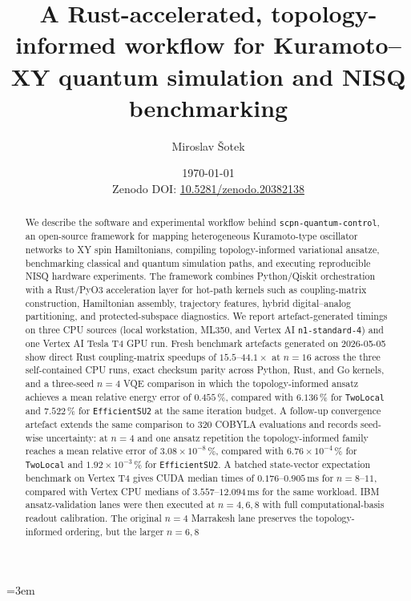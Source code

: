 \documentclass[preprint,aps,physrev,superscriptaddress,floatfix,longbibliography]{revtex4-2}
\newcommand{\paperdoi}{Zenodo DOI: \href{https://doi.org/10.5281/zenodo.20382138}{10.5281/zenodo.20382138}}
\begin{document}
\emergencystretch=3em

\title{A Rust-accelerated, topology-informed workflow for Kuramoto--XY
quantum simulation and NISQ benchmarking}

\author{Miroslav \v{S}otek}

\date{\today\\\paperdoi}

\begin{abstract}
We describe the software and experimental workflow behind
\texttt{scpn-quantum-control}, an open-source framework for mapping
heterogeneous Kuramoto-type oscillator networks to XY spin Hamiltonians,
compiling topology-informed variational ansatze, benchmarking classical
and quantum simulation paths, and executing reproducible NISQ hardware
experiments. The framework combines Python/Qiskit orchestration with a
Rust/PyO3 acceleration layer for hot-path kernels such as coupling-matrix
construction, Hamiltonian assembly, trajectory features, hybrid
digital--analog partitioning, and protected-subspace diagnostics. We report
artefact-generated timings on three CPU sources (local workstation, ML350,
and Vertex AI \texttt{n1-standard-4}) and one Vertex AI Tesla T4 GPU run.
Fresh benchmark artefacts generated on 2026-05-05 show direct
Rust coupling-matrix speedups of $15.5$--$44.1\times$ at $n=16$
across the three self-contained CPU runs, exact checksum parity across
Python, Rust, and Go kernels, and a
three-seed $n=4$ VQE comparison in which the topology-informed ansatz
achieves a mean relative energy error of $0.455\,\%$, compared with
$6.136\,\%$ for \texttt{TwoLocal} and $7.522\,\%$ for
\texttt{EfficientSU2} at the same iteration budget. A follow-up
convergence artefact extends the same comparison to 320 COBYLA
evaluations and records seed-wise uncertainty: at $n=4$ and one
ansatz repetition the topology-informed family reaches a mean relative
error of $3.08\times 10^{-8}\,\%$, compared with $6.76\times10^{-4}\,\%$
for \texttt{TwoLocal} and $1.92\times10^{-3}\,\%$ for
\texttt{EfficientSU2}. A batched
state-vector expectation benchmark on Vertex T4 gives CUDA median
times of $0.176$--$0.905\,\mathrm{ms}$ for $n=8$--$11$, compared with
Vertex CPU medians of $3.557$--$12.094\,\mathrm{ms}$ for the same
workload. IBM ansatz-validation lanes were then executed at $n=4,6,8$ with
full computational-basis readout calibration. The original $n=4$ Marrakesh
lane preserves the topology-informed ordering, but the larger $n=6,8$

\end{abstract}
\end{document}
